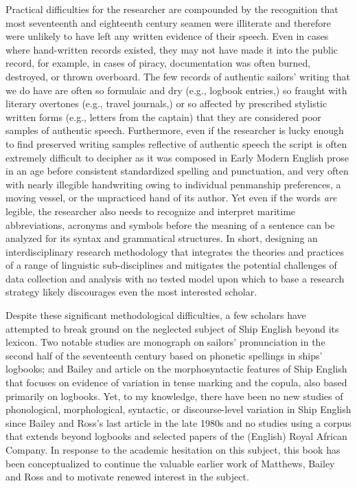 \begin{styleNormali}
Practical difficulties for the researcher are compounded by the recognition that most seventeenth and eighteenth century seamen were illiterate \citep[167]{Kelly2006} and therefore were unlikely to have left any written evidence of their speech. Even in cases where hand-written records existed, they may not have made it into the public record, for example, in cases of piracy, documentation was often burned, destroyed, or thrown overboard. The few records of authentic sailors’ writing that we do have are often so formulaic and dry (e.g., logbook entries,) so fraught with literary overtones (e.g., travel journals,) or so affected by prescribed stylistic written forms (e.g., letters from the captain) that they are considered poor samples of authentic speech. Furthermore, even if the researcher is lucky enough to find preserved writing samples reflective of authentic speech the script is often extremely difficult to decipher as it was composed in Early Modern English prose in an age before consistent standardized spelling and punctuation, and very often with nearly illegible handwriting owing to individual penmanship preferences, a moving vessel, or the unpracticed hand of its author. Yet even if the words \textit{are} legible, the researcher also needs to recognize and interpret maritime abbreviations, acronyms and symbols before the meaning of a sentence can be analyzed for its syntax and grammatical structures. In short, designing an interdisciplinary research methodology that integrates the theories and practices of a range of linguistic sub-disciplines and mitigates the potential challenges of data collection and analysis with no tested model upon which to base a research strategy likely discourages even the most interested scholar. 
\end{styleNormali}

\begin{styleNormali}
Despite these significant methodological difficulties, a few scholars have attempted to break ground on the neglected subject of Ship English beyond its lexicon. Two notable studies are  monograph on sailors’ pronunciation in the second half of the seventeenth century based on phonetic spellings in ships’ logbooks; and Bailey and  article on the morphosyntactic features of Ship English that focuses on evidence of variation in tense marking and the copula, also based primarily on logbooks. Yet, to my knowledge, there have been no new studies of phonological, morphological, syntactic, or discourse-level variation in Ship English since Bailey and Ross’s last article in the late 1980s and no studies using a corpus that extends beyond logbooks and selected papers of the (English) Royal African Company. In response to the academic hesitation on this subject, this book has been conceptualized to continue the valuable earlier work of Matthews, Bailey and Ross and to motivate renewed interest in the subject.  
\end{styleNormali}

